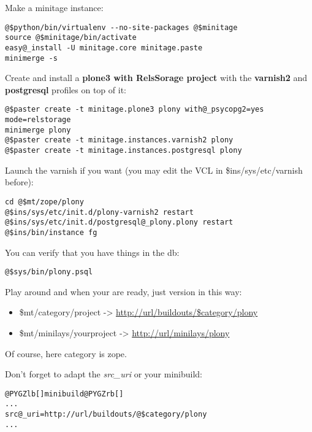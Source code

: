 \documentclass[letterpaper,10pt,english]{sphinxmanual}
\begin{document}
Make a minitage instance:

\begin{Verbatim}[commandchars=@\[\]]
@$python/bin/virtualenv --no-site-packages @$minitage
source @$minitage/bin/activate
easy@_install -U minitage.core minitage.paste
minimerge -s
\end{Verbatim}

Create and install a \textbf{plone3 with RelsSorage project} with the \textbf{varnish2} and \textbf{postgresql} profiles on top of it:

\begin{Verbatim}[commandchars=@\[\]]
@$paster create -t minitage.plone3 plony with@_psycopg2=yes mode=relstorage
minimerge plony
@$paster create -t minitage.instances.varnish2 plony
@$paster create -t minitage.instances.postgresql plony
\end{Verbatim}

Launch the varnish if you want (you may edit the VCL in \$ins/sys/etc/varnish before):

\begin{Verbatim}[commandchars=@\[\]]
cd @$mt/zope/plony
@$ins/sys/etc/init.d/plony-varnish2 restart
@$ins/sys/etc/init.d/postgresql@_plony.plony restart
@$ins/bin/instance fg
\end{Verbatim}

You can verify that you have things in the db:

\begin{Verbatim}[commandchars=@\[\]]
@$sys/bin/plony.psql
\end{Verbatim}

Play around and when your are ready, just version in this way:
\begin{itemize}
\item {} 
\$mt/category/project      -\textgreater{} \href{http://url/buildouts/\$category/plony}{http://url/buildouts/\$category/plony}

\item {} 
\$mt/minilays/yourproject  -\textgreater{} \href{http://url/minilays/plony}{http://url/minilays/plony}

\end{itemize}

Of course, here category is zope.

Don't forget to adapt the \emph{src\_uri} or your minibuild:

\begin{Verbatim}[commandchars=@\[\]]
@PYGZlb[]minibuild@PYGZrb[]
...
src@_uri=http://url/buildouts/@$category/plony
...
\end{Verbatim}
\end{document}
